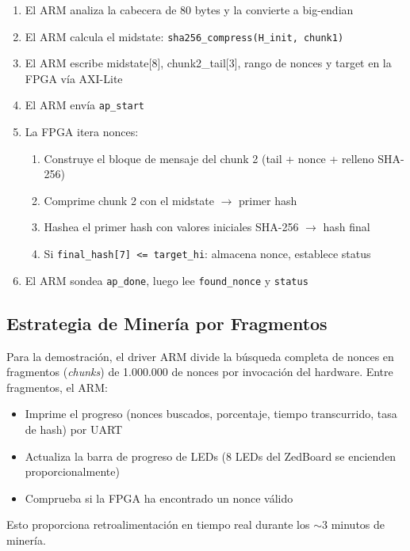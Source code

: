 \documentclass[12pt,a4paper]{article}
\begin{document}
\begin{enumerate}[leftmargin=2em]
    \item El ARM analiza la cabecera de 80 bytes y la convierte a big-endian
    \item El ARM calcula el midstate: \texttt{sha256\_compress(H\_init, chunk1)}
    \item El ARM escribe midstate[8], chunk2\_tail[3], rango de nonces y target en la FPGA v\'ia AXI-Lite
    \item El ARM env\'ia \texttt{ap\_start}
    \item La FPGA itera nonces:
    \begin{enumerate}
        \item Construye el bloque de mensaje del chunk 2 (tail + nonce + relleno SHA-256)
        \item Comprime chunk 2 con el midstate $\rightarrow$ primer hash
        \item Hashea el primer hash con valores iniciales SHA-256 $\rightarrow$ hash final
        \item Si \texttt{final\_hash[7] <= target\_hi}: almacena nonce, establece status
    \end{enumerate}
    \item El ARM sondea \texttt{ap\_done}, luego lee \texttt{found\_nonce} y \texttt{status}
\end{enumerate}

\subsection{Estrategia de Miner\'ia por Fragmentos}

Para la demostraci\'on, el driver ARM divide la b\'usqueda completa de nonces en
fragmentos (\textit{chunks}) de 1.000.000 de nonces por invocaci\'on del hardware.
Entre fragmentos, el ARM:
\begin{itemize}[leftmargin=2em]
    \item Imprime el progreso (nonces buscados, porcentaje, tiempo transcurrido, tasa de hash) por UART
    \item Actualiza la barra de progreso de LEDs (8 LEDs del ZedBoard se encienden proporcionalmente)
    \item Comprueba si la FPGA ha encontrado un nonce v\'alido
\end{itemize}

Esto proporciona retroalimentaci\'on en tiempo real durante los $\sim$3 minutos de miner\'ia.
\end{document}
